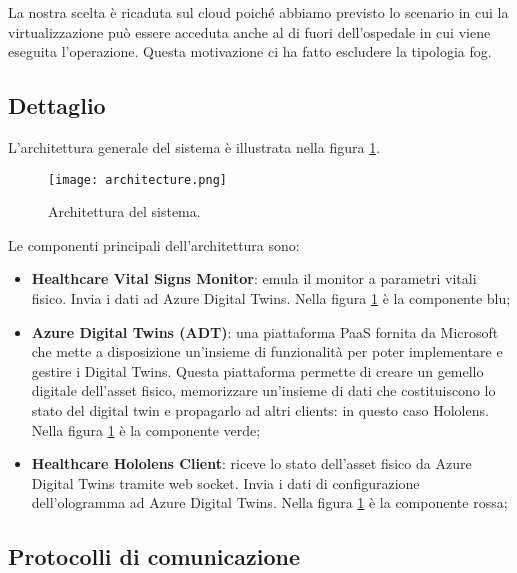 La nostra scelta è ricaduta sul cloud poiché abbiamo previsto lo scenario in cui la virtualizzazione può essere acceduta anche al di fuori dell'ospedale in cui viene eseguita l'operazione. Questa motivazione ci ha fatto escludere la tipologia fog. 

\subsection{Dettaglio}
L'architettura generale del sistema è illustrata nella figura \ref{pic:architecture}.

\begin{figure}[ht]
    \texttt{[image: architecture.png]}
    \centering
    \caption{\label{pic:architecture}Architettura del sistema.}
\end{figure}

Le componenti principali dell'architettura sono:

\begin{itemize}
    \item \textbf{Healthcare Vital Signs Monitor}: emula il monitor a parametri vitali fisico. Invia i dati ad Azure Digital Twins. Nella figura \ref{pic:architecture} è la componente blu;
    
    \item \textbf{Azure Digital Twins (ADT)}: una piattaforma PaaS fornita da Microsoft che mette a disposizione un'insieme di funzionalità per poter implementare e gestire i Digital Twins. Questa piattaforma permette di creare un gemello digitale dell'asset fisico, memorizzare un'insieme di dati che costituiscono lo stato del digital twin e propagarlo ad altri clients: in questo caso Hololens. Nella figura \ref{pic:architecture} è la componente verde;
    
    \item \textbf{Healthcare Hololens Client}: riceve lo stato dell'asset fisico da Azure Digital Twins tramite web socket. Invia i dati di configurazione dell'ologramma ad Azure Digital Twins. Nella figura \ref{pic:architecture} è la componente rossa;  
\end{itemize}

\subsection{Protocolli di comunicazione}


